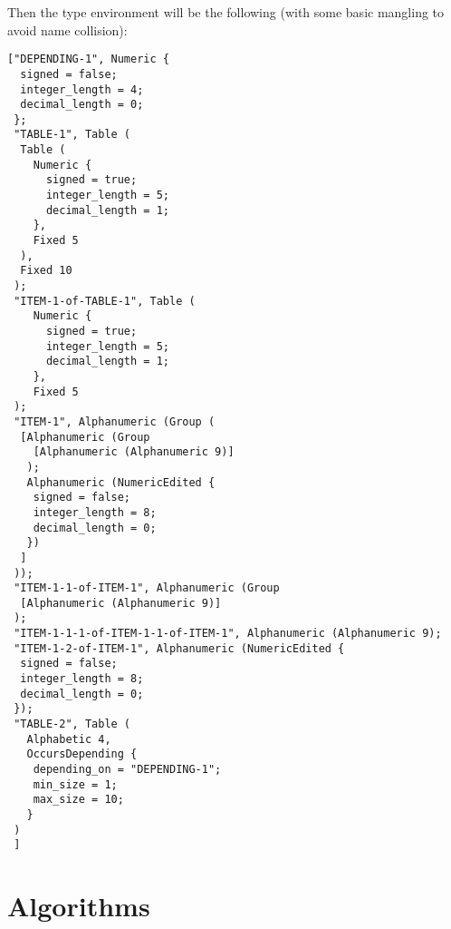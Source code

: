 \documentclass[a4paper,10pt]{article}
\begin{document}
Then the type environment will be the following (with some basic mangling to avoid name
collision):
\begin{verbatim}
["DEPENDING-1", Numeric {
  signed = false;
  integer_length = 4;
  decimal_length = 0;
 };
 "TABLE-1", Table (
  Table (
    Numeric {
      signed = true;
      integer_length = 5;
      decimal_length = 1;
    },
    Fixed 5
  ),
  Fixed 10
 );
 "ITEM-1-of-TABLE-1", Table (
    Numeric {
      signed = true;
      integer_length = 5;
      decimal_length = 1;
    },
    Fixed 5
 );
 "ITEM-1", Alphanumeric (Group (
  [Alphanumeric (Group
    [Alphanumeric (Alphanumeric 9)]
   );
   Alphanumeric (NumericEdited {
    signed = false;
    integer_length = 8;
    decimal_length = 0;
   })
  ]
 ));
 "ITEM-1-1-of-ITEM-1", Alphanumeric (Group
  [Alphanumeric (Alphanumeric 9)]
 );
 "ITEM-1-1-1-of-ITEM-1-1-of-ITEM-1", Alphanumeric (Alphanumeric 9);
 "ITEM-1-2-of-ITEM-1", Alphanumeric (NumericEdited {
  signed = false;
  integer_length = 8;
  decimal_length = 0;
 });
 "TABLE-2", Table (
   Alphabetic 4,
   OccursDepending {
    depending_on = "DEPENDING-1";
    min_size = 1;
    max_size = 10;
   }
 )
 ]
\end{verbatim}


\appendix
\section{Algorithms}
\end{document}
